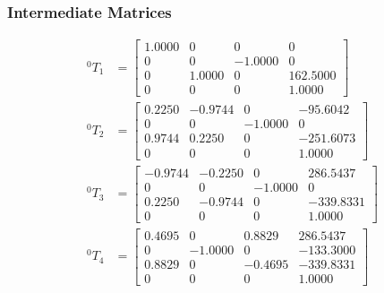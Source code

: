 \subsubsection{Intermediate Matrices}
\begin{equation*}
    \begin{split}
        ^{0}T_{1} & = \begin{bmatrix}
                          1.0000 & 0      & 0       & 0        \\
                          0      & 0      & -1.0000 & 0        \\
                          0      & 1.0000 & 0       & 162.5000 \\
                          0      & 0      & 0       & 1.0000
                      \end{bmatrix}    \\
        ^{0}T_{2} & = \begin{bmatrix}
                          0.2250 & -0.9744 & 0       & -95.6042  \\
                          0      & 0       & -1.0000 & 0         \\
                          0.9744 & 0.2250  & 0       & -251.6073 \\
                          0      & 0       & 0       & 1.0000
                      \end{bmatrix}  \\
        ^{0}T_{3} & = \begin{bmatrix}
                          -0.9744 & -0.2250 & 0       & 286.5437  \\
                          0       & 0       & -1.0000 & 0         \\
                          0.2250  & -0.9744 & 0       & -339.8331 \\
                          0       & 0       & 0       & 1.0000
                      \end{bmatrix} \\
        ^{0}T_{4} & = \begin{bmatrix}
                          0.4695 & 0       & 0.8829  & 286.5437  \\
                          0      & -1.0000 & 0       & -133.3000 \\
                          0.8829 & 0       & -0.4695 & -339.8331 \\
                          0      & 0       & 0       & 1.0000
                      \end{bmatrix}  \\

\end{split}
\end{equation*}
